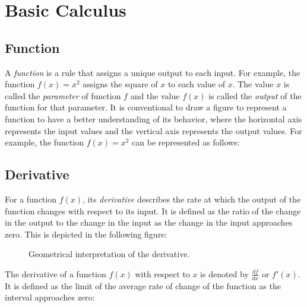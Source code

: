 \documentclass[12pt]{article}
\begin{document}
\section{Basic Calculus}

\subsection{Function}
A \emph{function} is a rule that assigns a unique output to each input. For example, the function \(f(x) = x^2\) assigns the square of \(x\) to each value of \(x\). The value $x$ is called the \emph{parameter} of function $f$ and the value $f(x)$ is called the \emph{output} of the function for that parameter. It is conventional to draw a figure to represent a function to have a better understanding of its behavior, where the horizontal axis represents the input values and the vertical axis represents the output values. For example, the function \(f(x) = x^2\) can be represented as follows:

\begin{figure}[h]
\centering
{}
\end{figure}


\subsection{Derivative}

For a function \(f(x)\), its \emph{derivative} describes the rate at which the output of the function changes with respect to its input. It is defined as the ratio of the change in the output to the change in the input as the change in the input approaches zero. This is depicted in the following figure:

\begin{figure}[h]
    \centering
    \caption{Geometrical interpretation of the derivative.}
    \label{fig:derivative}
\end{figure}

The derivative of a function \(f(x)\) with respect to \(x\) is denoted by
\(\frac{df}{dx}\) or \(f'(x)\). It is defined as the limit of the average rate of change of the function as the interval approaches zero:
\end{document}
